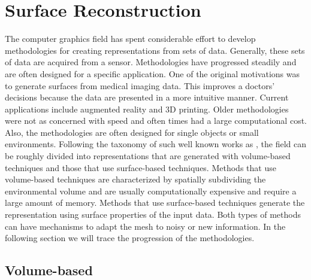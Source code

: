\section{Surface Reconstruction}

The computer graphics field has spent considerable effort to develop
methodologies for creating representations from sets of data. Generally, these
sets of data are acquired from a sensor. Methodologies have progressed steadily
and are often designed for a specific application. One of the original
motivations was to generate surfaces from medical imaging data. This improves a
doctors’ decisions because the data are presented in a more intuitive manner.
Current applications include augmented reality and 3D printing. Older
methodologies were not as concerned with speed and often times had a large
computational cost. Also, the methodologies are often designed for single
objects or small environments. Following the taxonomy of such well known works
as \cite{Gopi2002,Mencl1997}, the field can be roughly divided into
representations that are generated with volume-based techniques and those that
use surface-based techniques. Methods that use volume-based techniques are
characterized by spatially subdividing the environmental volume and are usually
computationally expensive and require a large amount of memory. Methods that use
surface-based techniques generate the representation using surface properties of
the input data. Both types of methods can have mechanisms to adapt the mesh to
noisy or new information. In the following section we will trace the progression
of the methodologies.

\subsection{Volume-based}

